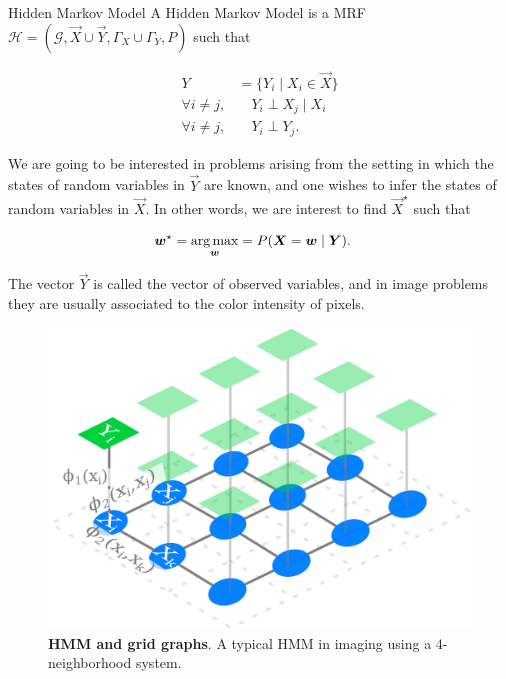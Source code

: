 \begin{definition}{Hidden Markov Model}
A Hidden Markov Model is a MRF $\mathcal{H} = (\mathcal{G},\vec{X} \cup \vec{Y}, \Gamma_X \cup \Gamma_Y,P)$ such that

\begin{align*}
	Y &= \{ Y_i \; | \; X_i \in \vec{X} \} \\
	\forall i \neq j,& \quad Y_i \perp X_j \; | \; X_i \\
	\forall i \neq j,& \quad Y_i \perp Y_j	.
\end{align*}
\end{definition}

We are going to be interested in problems arising from the setting in which the states of random variables in $\vec{Y}$ are known, and one wishes to infer the states of random variables in $\vec{X}$. In other words, we are interest to find $\vec{X}^{\star}$ such that

\begin{align}
	\bm{w}^{\star} &= \operatorname*{arg\,max}_{\bm{w}} = P(\bm{X} = \bm{w} \; | \; \bm{Y}).
	\label{ch2:eq:general-maximum-likelihood}
\end{align}

The vector $\vec{Y}$ is called the vector of observed variables, and in image problems they are usually associated to the color intensity of pixels. 

\begin{figure}
\center
\includegraphics[scale=0.10]{figures/chapter3/mrf/hmm-example.png}
\caption{\textbf{HMM and grid graphs}. A typical HMM in imaging using a $4$-neighborhood system.}
\label{ch2:fig:hmm-multilabeling}
\end{figure}



